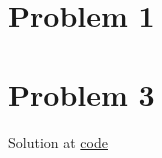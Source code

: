 \documentclass[11pt]{article}
\begin{document}
\maketitle
\thispagestyle{first}

\section*{Problem 1}

\section*{Problem 3}
Solution at \href{https://github.com/MatthewWilsonThomas/CME241-RLForFinance/blob/master/Problem%20Sets/Assignment_5/Q3-OrderBookDynamics.py}{code}
\end{document}
